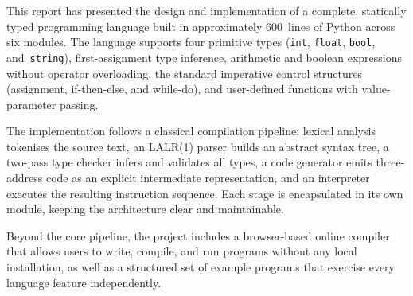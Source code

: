 \documentclass[12pt,a4paper]{report}
\newcommand{\tint}{\texttt{int}}
\newcommand{\tfloat}{\texttt{float}}
\newcommand{\tbool}{\texttt{bool}}
\newcommand{\tstring}{\texttt{string}}
\begin{document}
This report has presented the design and implementation of a complete,
statically typed programming language built in approximately 600~lines of
Python across six modules. The language supports four primitive types
(\tint, \tfloat, \tbool, and~\tstring), first-assignment type inference,
arithmetic and boolean expressions without operator overloading, the standard
imperative control structures (assignment, if-then-else, and while-do), and
user-defined functions with value-parameter passing.

The implementation follows a classical compilation pipeline: lexical analysis
tokenises the source text, an LALR(1) parser builds an abstract syntax tree,
a two-pass type checker infers and validates all types, a code generator
emits three-address code as an explicit intermediate representation, and an
interpreter executes the resulting instruction sequence. Each stage is
encapsulated in its own module, keeping the architecture clear and
maintainable.

Beyond the core pipeline, the project includes a browser-based online
compiler that allows users to write, compile, and run programs without any
local installation, as well as a structured set of example programs that
exercise every language feature independently.
\end{document}
